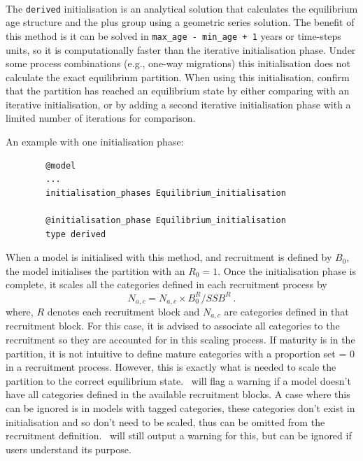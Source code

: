 \paragraph{}\label{sec:InitialisationPhase-Derived}

The \texttt{derived} initialisation is an analytical solution that calculates the equilibrium age structure and the plus group using a geometric series solution. The benefit of this method is it can be solved in \texttt{max\_age - min\_age + 1} years or time-steps units, so it is computationally faster than the iterative initialisation phase. Under some process combinations (e.g., one-way migrations) this initialisation does not calculate the exact equilibrium partition. When using this initialisation, confirm that the partition has reached an equilibrium state by either comparing with an iterative initialisation, or by adding a second iterative initialisation phase with a limited number of iterations for comparison.

An example with one initialisation phase:

{\small{\begin{verbatim}
		@model
		...
		initialisation_phases Equilibrium_initialisation

		@initialisation_phase Equilibrium_initialisation
		type derived
		\end{verbatim}}}


When a model is initialised with this method, and recruitment is defined by \(B_0\), the model initialises the partition with an \(R_0 = 1\). Once the initialisation phase is complete, it scales all the categories defined in each recruitment process by
\[
N_{a,c}  = N_{a,c} \times B_0^R / SSB^R  \ .
\]
where, \(R\) denotes each recruitment block and \(N_{a,c}\) are categories defined in that recruitment block. For this case, it is advised to associate all categories to the recruitment so they are accounted for in this scaling process. If maturity is in the partition, it is not intuitive to define mature categories with a proportion set = 0 in a recruitment process. However, this is exactly what is needed to scale the partition to the correct equilibrium state. \CNAME\ will flag a warning if a model doesn't have all categories defined in the available recruitment blocks. A case where this can be ignored is in models with tagged categories, these categories don't exist in initialisation and so don't need to be scaled, thus can be omitted from the recruitment definition. \CNAME\ will still output a warning for this, but can be ignored if users understand its purpose.

